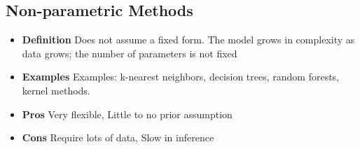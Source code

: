 \documentclass[11pt]{article}
\begin{document}
\subsection*{Non-parametric Methods}
\begin{itemize}
	\item \textbf{Definition}
	      Does not assume a fixed form. The model grows in complexity as data grows; the number of parameters is not fixed
	\item \textbf{Examples}
	      Examples: k-nearest neighbors, decision trees, random forests, kernel methods.
	\item \textbf{Pros}
	      Very flexible, Little to no prior assumption
	\item \textbf{Cons}
	      Require lots of data, Slow in inference
\end{itemize}
\end{document}
